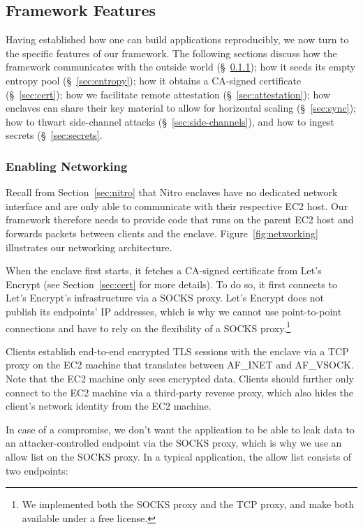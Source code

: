 \subsection{Framework Features}
\label{sec:framework}

Having established how one can build applications reproducibly, we now turn to
the specific features of our framework.  The following sections discuss how the
framework communicates with the outside world (\S~\ref{sec:networking});
how it seeds its empty entropy pool (\S~\ref{sec:entropy});
how it obtains a CA-signed certificate (\S~\ref{sec:cert});
how we facilitate remote attestation (\S~\ref{sec:attestation});
how enclaves can share their key material to allow for horizontal scaling (\S~\ref{sec:sync});
how to thwart side-channel attacks (\S~\ref{sec:side-channels}), and
how to ingest secrets (\S~\ref{sec:secrets}.

\subsubsection{Enabling Networking}
\label{sec:networking}

Recall from Section~\ref{sec:nitro} that Nitro enclaves have no dedicated
network interface and are only able to communicate with their respective EC2
host.  Our framework therefore needs to provide code that runs on the parent
EC2 host and forwards packets between clients and the enclave.
Figure~\ref{fig:networking} illustrates our networking architecture.

When the enclave first starts, it fetches a CA-signed certificate from Let's
Encrypt (see Section~\ref{sec:cert} for more details).  To do so, it first
connects to Let's Encrypt's infrastructure via a SOCKS proxy.  Let's Encrypt
does not publish its endpoints' IP addresses, which is why we cannot use
point-to-point connections and have to rely on the flexibility of a SOCKS
proxy.\footnote{We implemented both the SOCKS proxy and the TCP proxy, and make
both available under a free license.}

Clients establish end-to-end encrypted TLS sessions with the enclave via a TCP
proxy on the EC2 machine that translates between AF\_INET and AF\_VSOCK.  Note
that the EC2 machine only sees encrypted data. Clients should further only
connect to the EC2 machine via a third-party reverse proxy, which also hides
the client's network identity from the EC2 machine.

In case of a compromise, we don't want the application to be able to leak data
to an attacker-controlled endpoint via the SOCKS proxy, which is why we use an
allow list on the SOCKS proxy.  In a typical application, the allow list
consists of two endpoints:

